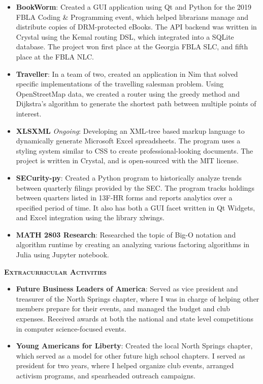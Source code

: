 \documentclass{article}
\begin{document}
  \begin{itemize}
    \item \textbf{BookWorm}: Created a GUI application using Qt and Python for the 2019 FBLA Coding \& Programming event, which helped librarians manage and distribute copies of DRM-protected eBooks. The API backend was written in Crystal using the Kemal routing DSL, which integrated into a SQLite database. The project won first place at the Georgia FBLA SLC, and fifth place at the FBLA NLC.
    \item \textbf{Traveller}: In a team of two, created an application in Nim that solved specific implementations of the travelling salesman problem. Using OpenStreetMap data, we created a router using the greedy method and Dijkstra's algorithm to generate the shortest path between multiple points of interest.
    \item \textbf{XLSXML} {\footnotesize \textit{Ongoing}}: Developing an XML-tree based markup language to dynamically generate Microsoft Excel spreadsheets. The program uses a styling system similar to CSS to create professional-looking documents. The project is written in Crystal, and is open-sourced with the MIT license.
    \item \textbf{SECurity-py}: Created a Python program to historically analyze trends between quarterly filings provided by the SEC. The program tracks holdings between quarters listed in 13F-HR forms and reports analytics over a specified period of time. It also has both a GUI facet written in Qt Widgets, and Excel integration using the library xlwings.
    \item \textbf{MATH 2803 Research}: Researched the topic of Big-O notation and algorithm runtime by creating an analyzing various factoring algorithms in Julia using Jupyter notebook.
  \end{itemize}

  \vspace{10pt}

  {\large \textbf{\textsc{Extracurricular Activities}}}\hspace{5pt}\xrfill[.5ex]{.4pt}
  
  \vspace{3pt}

  \begin{itemize}
    \item \textbf{Future Business Leaders of America}: Served as vice president and treasurer of the North Springs chapter, where I was in charge of helping other members prepare for their events, and managed the budget and club expenses. Received awards at both the national and state level competitions in computer science-focused events.
    \item \textbf{Young Americans for Liberty}: Created the local North Springs chapter, which served as a model for other future high school chapters. I served as president for two years, where I helped organize club events, arranged activism programs, and spearheaded outreach campaigns.
  \end{itemize}
\end{document}
